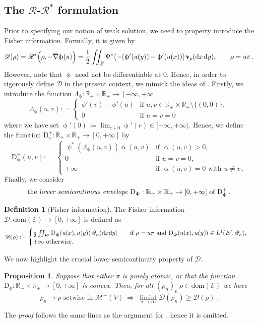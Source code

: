 \documentclass[11pt,reqno]{amsart}
\numberwithin{equation}{section}
\newcommand{\R}{\mathbb{R}}
\newcommand{\calM}{\mathcal{M}}
\newcommand{\dnabla}{\overline\nabla}
\newcommand{\dd}{\mathrm{d}}
\newtheorem{proposition}[theorem]{Proposition}
\theoremstyle{definition}
\newtheorem{definition}[theorem]{Definition}
\def\dd{\mathrm{d}}
\newcommand{\edg}{E}
\newcommand{\ona}{\dnabla}
\newcommand{\Fish}{\mathscr{D}}
\newcommand{\teta}{\boldsymbol \vartheta}
\newcommand{\tetapi}{\boldsymbol{\teta}_{\kappa}}
\newcommand{\thalf}{\relax} %
\newcommand{\bnu}{\boldsymbol\upnu}
\newcommand{\scrR}{\mathscr{R}}
\newcommand{\scrD}{\mathscr{D}}
\newcommand{\scrE}{\mathscr{E}}
\newcommand{\RNEW}{\color{black}} %
\newcommand{\EEE}{\color{black}}
\numberwithin{equation}{section}
\begin{document}
\subsection{The $\scrR$-$\scrR^*$ formulation}
Prior to specifying our notion of weak solution, we need to property introduce the Fisher information. 
Formally, it is given by 
\[
\Fish(\rho) = \scrR^*\Bigl(\rho,-\thalf \ona \upphi(u)\Bigr)
=
 \frac12
\iint_\edg \Psi^*\bigl( -\thalf(\upphi'(u(y))-\upphi'(u(x))\bigr) \bnu_\rho(\dd x \, \dd y),\qquad \rho = u\pi\, .
\]
However, note that $\upphi$ need not be differentiable at $0$. Hence,  in order to
 rigorously define $\Fish$ in the present context, we mimick the ideas of \cite{PRST22}. Firstly, we introduce the function
$\Lambda_\upphi: \R_+\times \R_+ \to [-\infty,+\infty]$
\[
\Lambda_\upphi (u,v): =\begin{cases}
\phi'(v)-\phi'(u) & \text{if } u,v \in \R_+\times \R_+ \setminus \{ (0,0)\},
\\
0 & \text{if } u=v=0\,
\end{cases}
\]
where we have set $\upphi'(0) := \lim_{r\downarrow 0} \upphi'(r) \in [-\infty,+\infty) $. 
Hence, we define the function $\mathrm{D}_\upphi^+: \R_+\times \R_+ \to [0,+\infty]$ by
\[
\mathrm{D}_\upphi^+(u,v): = \begin{cases}
\uppsi^*\left( \Lambda_\upphi (u,v) \right) \upalpha (u,v) & \text{if } \upalpha (u,v)>0,
\\
0 
& \text{if } u=v=0,
\\
+\infty & \text{if } \upalpha(u,v)=0 \text{ with } u \neq v\,.
\end{cases}
\]
Finally, we consider
\[
\text{the \emph{lower semicontinous envelope} } \mathrm{D}_\upphi: \R_+\times \R_+ \to [0,+\infty]  \text{ of }   \mathrm{D}_\upphi^+\,.
\]
\begin{definition}[Fisher information]
\label{Def:Fisher}
The Fisher information $\Fish: \mathrm{dom}(\scrE)\to [0,+\infty]$ is defined as
\[
\Fish(\rho): = 
\begin{cases}
\frac12 \iint_{E'}  \mathrm{D}_\upphi(u(x),u(y)) \, \tetapi(\dd x \dd y) \qquad \text{if  } \rho = u \pi \text{ and  $ \mathrm{D}_\upphi(u(x),u(y)) \in L^1(E',\tetapi)$,}
\\
+\infty \text{ otherwise.}
\end{cases} 
\]
\end{definition}








We now highlight the crucial lower semicontinuity property of $\mathscr{D}$. 
\begin{proposition}
\label{prop:Fisher-lsc}
Suppose that  \RNEW either $\pi$ is purely atomic, or that the function  $\mathrm{D}_\upphi: \R_+\times \R_+ \to [0,+\infty]$ is convex. \EEE
 Then,
for all  $(\rho_n)_n\, \rho \in \mathrm{dom}(\scrE)$ we have 
\[
\rho_n\to \rho \text{ setwise in } \calM^+(V) \ \Longrightarrow \ \liminf_{n\to\infty} \scrD(\rho_n)\geq \scrD(\rho)\,.
\]
\end{proposition}
\RNEW The \emph{proof} follows the same lines as the argument for \cite[Prop.\ 5.3]{PRST22}, hence it is omitted. \EEE  
\end{document}
